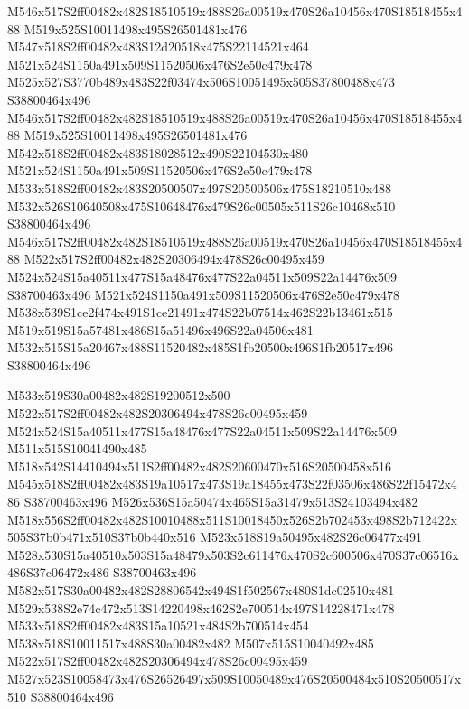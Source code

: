 \documentclass{article}
\begin{document}
\begin{multicols}{2}
M546x517S2ff00482x482S18510519x488S26a00519x470S26a10456x470S18518455x488 M519x525S10011498x495S26501481x476 M547x518S2ff00482x483S12d20518x475S22114521x464 M521x524S1150a491x509S11520506x476S2e50c479x478 M525x527S3770b489x483S22f03474x506S10051495x505S37800488x473 S38800464x496 M546x517S2ff00482x482S18510519x488S26a00519x470S26a10456x470S18518455x488 M519x525S10011498x495S26501481x476 M542x518S2ff00482x483S18028512x490S22104530x480 M521x524S1150a491x509S11520506x476S2e50c479x478 M533x518S2ff00482x483S20500507x497S20500506x475S18210510x488 M532x526S10640508x475S10648476x479S26c00505x511S26c10468x510 S38800464x496 M546x517S2ff00482x482S18510519x488S26a00519x470S26a10456x470S18518455x488 M522x517S2ff00482x482S20306494x478S26c00495x459 M524x524S15a40511x477S15a48476x477S22a04511x509S22a14476x509 S38700463x496 M521x524S1150a491x509S11520506x476S2e50c479x478 M538x539S1ce2f474x491S1ce21491x474S22b07514x462S22b13461x515 M519x519S15a57481x486S15a51496x496S22a04506x481 M532x515S15a20467x488S11520482x485S1fb20500x496S1fb20517x496 S38800464x496

M533x519S30a00482x482S19200512x500 M522x517S2ff00482x482S20306494x478S26c00495x459 M524x524S15a40511x477S15a48476x477S22a04511x509S22a14476x509 M511x515S10041490x485 M518x542S14410494x511S2ff00482x482S20600470x516S20500458x516 M545x518S2ff00482x483S19a10517x473S19a18455x473S22f03506x486S22f15472x486 S38700463x496 M526x536S15a50474x465S15a31479x513S24103494x482 M518x556S2ff00482x482S10010488x511S10018450x526S2b702453x498S2b712422x505S37b0b471x510S37b0b440x516 M523x518S19a50495x482S26c06477x491 M528x530S15a40510x503S15a48479x503S2c611476x470S2c600506x470S37c06516x486S37c06472x486 S38700463x496 M582x517S30a00482x482S28806542x494S1f502567x480S1dc02510x481 M529x538S2e74c472x513S14220498x462S2e700514x497S14228471x478 M533x518S2ff00482x483S15a10521x484S2b700514x454 M538x518S10011517x488S30a00482x482 M507x515S10040492x485 M522x517S2ff00482x482S20306494x478S26c00495x459 M527x523S10058473x476S26526497x509S10050489x476S20500484x510S20500517x510 S38800464x496


\end{multicols}
\end{document}
